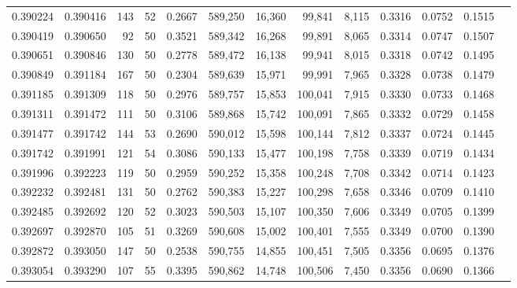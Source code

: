 \begin{tabular}{rrrrrrrrrrrrr}
0.390224 & 0.390416 &   143 &  52 &                                     0.2667 & 589,250 &  16,360 &  99,841 &   8,115 & 0.3316 & 0.0752 & 0.1515 \\
0.390419 & 0.390650 &    92 &  50 &                                     0.3521 & 589,342 &  16,268 &  99,891 &   8,065 & 0.3314 & 0.0747 & 0.1507 \\
0.390651 & 0.390846 &   130 &  50 &                                     0.2778 & 589,472 &  16,138 &  99,941 &   8,015 & 0.3318 & 0.0742 & 0.1495 \\
0.390849 & 0.391184 &   167 &  50 &                                     0.2304 & 589,639 &  15,971 &  99,991 &   7,965 & 0.3328 & 0.0738 & 0.1479 \\
0.391185 & 0.391309 &   118 &  50 &                                     0.2976 & 589,757 &  15,853 & 100,041 &   7,915 & 0.3330 & 0.0733 & 0.1468 \\
0.391311 & 0.391472 &   111 &  50 &                                     0.3106 & 589,868 &  15,742 & 100,091 &   7,865 & 0.3332 & 0.0729 & 0.1458 \\
0.391477 & 0.391742 &   144 &  53 &                                     0.2690 & 590,012 &  15,598 & 100,144 &   7,812 & 0.3337 & 0.0724 & 0.1445 \\
0.391742 & 0.391991 &   121 &  54 &                                     0.3086 & 590,133 &  15,477 & 100,198 &   7,758 & 0.3339 & 0.0719 & 0.1434 \\
0.391996 & 0.392223 &   119 &  50 &                                     0.2959 & 590,252 &  15,358 & 100,248 &   7,708 & 0.3342 & 0.0714 & 0.1423 \\
0.392232 & 0.392481 &   131 &  50 &                                     0.2762 & 590,383 &  15,227 & 100,298 &   7,658 & 0.3346 & 0.0709 & 0.1410 \\
0.392485 & 0.392692 &   120 &  52 &                                     0.3023 & 590,503 &  15,107 & 100,350 &   7,606 & 0.3349 & 0.0705 & 0.1399 \\
0.392697 & 0.392870 &   105 &  51 &                                     0.3269 & 590,608 &  15,002 & 100,401 &   7,555 & 0.3349 & 0.0700 & 0.1390 \\
0.392872 & 0.393050 &   147 &  50 &                                     0.2538 & 590,755 &  14,855 & 100,451 &   7,505 & 0.3356 & 0.0695 & 0.1376 \\
0.393054 & 0.393290 &   107 &  55 &                                     0.3395 & 590,862 &  14,748 & 100,506 &   7,450 & 0.3356 & 0.0690 & 0.1366 \\

\end{tabular}
